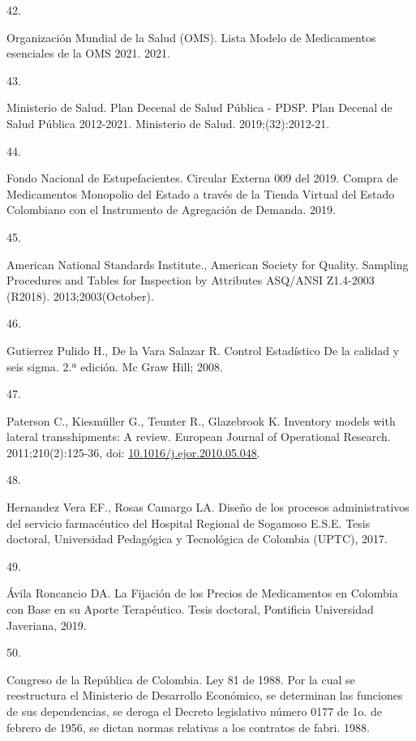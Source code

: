\documentclass[
  oneside]{book}
\newlength{\cslhangindent}
\newlength{\csllabelwidth}
\newlength{\cslentryspacingunit} %
\newenvironment{CSLReferences}[2] %
 {%
  \setlength{\parindent}{0pt}
  \ifodd #1
  \let\oldpar\par
  \def\par{\hangindent=\cslhangindent\oldpar}
  \fi
  \setlength{\parskip}{#2\cslentryspacingunit}
 }%
 {}
\newcommand{\CSLLeftMargin}[1]{\parbox[t]{\csllabelwidth}{#1}}
\newcommand{\CSLRightInline}[1]{\parbox[t]{\linewidth - \csllabelwidth}{#1}\break}
\begin{document}
\begin{CSLReferences}{0}{0}
\leavevmode{}%
\CSLLeftMargin{42. }
\CSLRightInline{Organización Mundial de la Salud (OMS). {Lista Modelo de Medicamentos esenciales de la OMS 2021}. 2021.}

\leavevmode{}%
\CSLLeftMargin{43. }
\CSLRightInline{Ministerio de Salud. {Plan Decenal de Salud P{ú}blica - PDSP. Plan Decenal de Salud P{ú}blica 2012-2021}. Ministerio de Salud. 2019;(32):2012-21.}

\leavevmode{}%
\CSLLeftMargin{44. }
\CSLRightInline{Fondo Nacional de Estupefacientes. {Circular Externa 009 del 2019. Compra de Medicamentos Monopolio del Estado a trav{é}s de la Tienda Virtual del Estado Colombiano con el Instrumento de Agregaci{ó}n de Demanda}. 2019.}

\leavevmode{}%
\CSLLeftMargin{45. }
\CSLRightInline{American National Standards Institute., American Society for Quality. {Sampling Procedures and Tables for Inspection by Attributes ASQ/ANSI Z1.4-2003 (R2018)}. 2013;2003(October).}

\leavevmode{}%
\CSLLeftMargin{46. }
\CSLRightInline{Gutierrez Pulido H., De la Vara Salazar R. {Control Estad{í}stico De la calidad y seis sigma}. 2.ª edición. Mc Graw Hill; 2008.}

\leavevmode{}%
\CSLLeftMargin{47. }
\CSLRightInline{Paterson C., Kiesmüller G., Teunter R., Glazebrook K. {Inventory models with lateral transshipments: A review}. European Journal of Operational Research. 2011;210(2):125-36, doi: \href{https://doi.org/10.1016/j.ejor.2010.05.048}{10.1016/j.ejor.2010.05.048}.}

\leavevmode{}%
\CSLLeftMargin{48. }
\CSLRightInline{Hernandez Vera EF., Rosas Camargo LA. {Dise{ñ}o de los procesos administrativos del servicio farmac{é}utico del Hospital Regional de Sogamoso E.S.E.} Tesis doctoral, Universidad Pedag{ó}gica y Tecnol{ó}gica de Colombia (UPTC), 2017.}

\leavevmode{}%
\CSLLeftMargin{49. }
\CSLRightInline{Ávila Roncancio DA. {La Fijaci{ó}n de los Precios de Medicamentos en Colombia con Base en su Aporte Terap{é}utico}. Tesis doctoral, Pontificia Universidad Javeriana, 2019.}

\leavevmode{}%
\CSLLeftMargin{50. }
\CSLRightInline{Congreso de la República de Colombia. {Ley 81 de 1988. Por la cual se reestructura el Ministerio de Desarrollo Econ{ó}mico, se determinan las funciones de sus dependencias, se deroga el Decreto legislativo n{ú}mero 0177 de 1o. de febrero de 1956, se dictan normas relativas a los contratos de fabri}. 1988.}


\end{CSLReferences}
\end{document}

